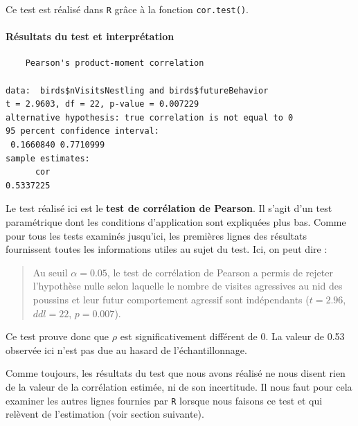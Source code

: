 \documentclass[
  a4paper,
]{article}
\newenvironment{Shaded}{\begin{snugshade}}{\end{snugshade}}
\newcommand{\FunctionTok}[1]{\textcolor[rgb]{0.39,0.29,0.61}{#1}}
\newcommand{\NormalTok}[1]{\textcolor[rgb]{0.12,0.11,0.11}{#1}}
\newcommand{\SpecialCharTok}[1]{\textcolor[rgb]{0.24,0.68,0.91}{#1}}
\begin{document}
Ce test est réalisé dans \texttt{R} grâce à la fonction \texttt{cor.test()}.

\hypertarget{ruxe9sultats-du-test-et-interpruxe9tation}{%
\paragraph{Résultats du test et interprétation}\label{ruxe9sultats-du-test-et-interpruxe9tation}}

\begin{Shaded}
\end{Shaded}

\begin{verbatim}
    Pearson's product-moment correlation

data:  birds$nVisitsNestling and birds$futureBehavior
t = 2.9603, df = 22, p-value = 0.007229
alternative hypothesis: true correlation is not equal to 0
95 percent confidence interval:
 0.1660840 0.7710999
sample estimates:
      cor 
0.5337225 
\end{verbatim}

Le test réalisé ici est le \textbf{test de corrélation de Pearson}. Il s'agit d'un test paramétrique dont les conditions d'application sont expliquées plus bas. Comme pour tous les tests examinés jusqu'ici, les premières lignes des résultats fournissent toutes les informations utiles au sujet du test. Ici, on peut dire :

\begin{quote}
Au seuil \(\alpha = 0.05\), le test de corrélation de Pearson a permis de rejeter l'hypothèse nulle selon laquelle le nombre de visites agressives au nid des poussins et leur futur comportement agressif sont indépendants (\(t = 2.96\), \(ddl = 22\), \(p = 0.007\)).
\end{quote}

Ce test prouve donc que \(\rho\) est significativement différent de 0. La valeur de 0.53 observée ici n'est pas due au hasard de l'échantillonnage.

Comme toujours, les résultats du test que nous avons réalisé ne nous disent rien de la valeur de la corrélation estimée, ni de son incertitude. Il nous faut pour cela examiner les autres lignes fournies par \texttt{R} lorsque nous faisons ce test et qui relèvent de l'estimation (voir section suivante).
\end{document}
